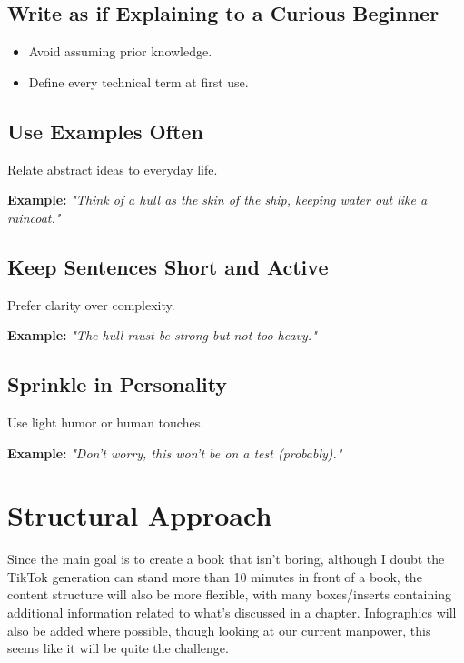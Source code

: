 \documentclass[12pt]{article}
\begin{document}
\subsection{Write as if Explaining to a Curious Beginner}
\begin{itemize}
  \item Avoid assuming prior knowledge.
  \item Define every technical term at first use.
\end{itemize}

\subsection{Use Examples Often}
Relate abstract ideas to everyday life.

\textbf{Example:} \textit{"Think of a hull as the skin of the ship, keeping water out like a raincoat."}

\subsection{Keep Sentences Short and Active}
Prefer clarity over complexity.

\textbf{Example:} \textit{"The hull must be strong but not too heavy."}

\subsection{Sprinkle in Personality}
Use light humor or human touches.

\textbf{Example:} \textit{"Don’t worry, this won’t be on a test (probably)."}

\section{Structural Approach}
Since the main goal is to create a book that isn't boring, although I doubt the TikTok generation can stand more than 10 minutes in front of a book, the content structure will also be more flexible, with many boxes/inserts containing additional information related to what's discussed in a chapter. Infographics will also be added where possible, though looking at our current manpower, this seems like it will be quite the challenge.
\end{document}
